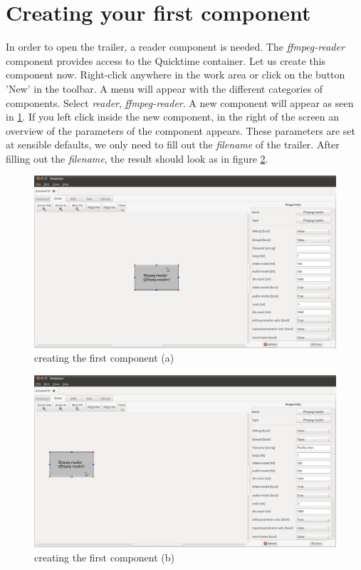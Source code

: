 \documentclass[12pt]{report}
\begin{document}
\section{Creating your first component}
In order to open the trailer, a reader component is needed. The \textit{ffmpeg-reader} component provides access to the Quicktime container. Let us create this component now. Right-click anywhere in the work area or click on the button 'New' in the toolbar. A menu will appear with the different categories of components. Select \textit{reader}, \textit{ffmpeg-reader}. A new component will appear as seen in \ref{fig:7}. If you left click inside the new component, in the right of the screen an overview of the parameters of the component appears. These parameters are set at sensible defaults, we only need to fill out the \textit{filename} of the trailer. After filling out the \textit{filename}, the result should look as in figure \ref{fig:8}.
\begin{center}
\begin{figure}[!ht]
	\includegraphics[width=1.0\textwidth]{./images/ui02.png}
	\caption{creating the first component (a)}
	\label{fig:7}
\end{figure}
\end{center}
\newpage
\begin{center}
\begin{figure}[!ht]
	\includegraphics[width=1.0\textwidth]{./images/ui03.png}
	\caption{creating the first component (b)}
	\label{fig:8}
\end{figure}
\end{center}
\newpage
\end{document}
